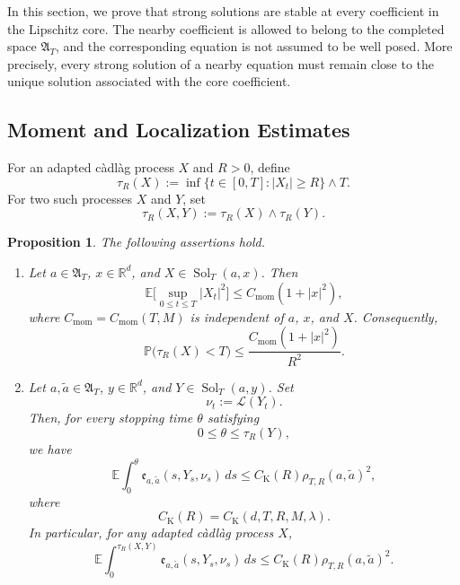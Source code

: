 \documentclass[12pt,oneside, reqno]{amsart}
\newtheorem{proposition}[theorem]{Proposition}
\numberwithin{equation}{section}
\begin{document}
	In this section, we prove that strong solutions are stable at every
	coefficient in the Lipschitz core. The nearby coefficient is allowed
	to belong to the completed space $\mathfrak A_T$, and the
	corresponding equation is not assumed to be well posed. More
	precisely, every strong solution of a nearby equation must remain
	close to the unique solution associated with the core coefficient.
	
	
	
	\subsection{Moment and Localization Estimates}
	
	For an adapted c\`adl\`ag process $X$ and $R>0$, define
	\[
	\tau_R(X)
	:=
	\inf\{t\in[0,T]:|X_t|\geq R\}\wedge T.
	\]
	For two such processes $X$ and $Y$, set
	\[
	\tau_R(X,Y)
	:=
	\tau_R(X)\wedge\tau_R(Y).
	\]
	
	\begin{proposition}
		\label{prop:moment-localization-estimates}
		The following assertions hold.
		
		\begin{enumerate}
			\item[\textnormal{(i)}]
			Let $a\in\mathfrak A_T$, $x\in\mathbb R^d$, and
			$X\in\operatorname{Sol}_T(a,x)$. Then
			\begin{equation}
				\label{eq:uniform-second-moment}
				\mathbb E\big[
				\sup_{0\leq t\leq T}|X_t|^2
				\big]
				\leq
				C_{\mathrm{mom}}(1+|x|^2),
			\end{equation}
			where $C_{\mathrm{mom}}=C_{\mathrm{mom}}(T,M)$ is independent
			of $a$, $x$, and $X$. Consequently,
			\begin{equation}
				\label{eq:uniform-exit-probability}
				\mathbb P\bigl(\tau_R(X)<T\bigr)
				\leq
				\frac{C_{\mathrm{mom}}(1+|x|^2)}{R^2}.
			\end{equation}
			
			\item[\textnormal{(ii)}]
			Let $a,\widetilde a\in\mathfrak A_T$,
			$y\in\mathbb R^d$, and
			$Y\in\operatorname{Sol}_T(a,y)$. Set
			\[
			\nu_t:=\mathcal L(Y_t).
			\]
			Then, for every stopping time $\theta$ satisfying
			\[
			0\leq\theta\leq\tau_R(Y),
			\]
			we have
			\begin{equation}
				\label{eq:stopped-coefficient-error}
				\mathbb E\int_0^\theta
				\mathfrak e_{a,\widetilde a}
				(s,Y_s,\nu_s)\,ds
				\leq
				C_{\mathrm K}(R)
				\rho_{T,R}(a,\widetilde a)^2,
			\end{equation}
			where
			\[
			C_{\mathrm K}(R)
			=
			C_{\mathrm K}(d,T,R,M,\lambda).
			\]
			In particular, for any adapted c\`adl\`ag process $X$,
			\begin{equation}
				\label{eq:common-stopped-error}
				\mathbb E\int_0^{\tau_R(X,Y)}
				\mathfrak e_{a,\widetilde a}
				(s,Y_s,\nu_s)\,ds
				\leq
				C_{\mathrm K}(R)
				\rho_{T,R}(a,\widetilde a)^2.
			\end{equation}
		\end{enumerate}
	\end{proposition}
	
\end{document}
